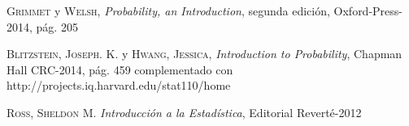 \documentclass[10pt,a4paper]{article}
\theoremstyle{definition}
\theoremstyle{remark}
\begin{document}
\begin{multicols}{2}
\begin{list}{}{\setlength{\topsep}{0mm}\setlength{\itemsep}{0mm}%
\setlength{\parsep}{0mm}\setlength{\leftmargin}{4mm}}
%
\small
\item[1.]  \textsc{Grimmet} y \textsc{Welsh},
	\textit{Probability, an Introduction}, segunda edición, Oxford-Press-2014, pág. 205
	
\item[2.] \textsc{Blitzstein, Joseph. K.} y \textsc{Hwang, Jessica},
	\textit{Introduction to Probability}, Chapman Hall CRC-2014, pág. 459 complementado con http://projects.iq.harvard.edu/stat110/home
	
\item[3.] \textsc{Ross, Sheldon M.}
	\textit{Introducción a la Estadística}, Editorial Reverté-2012

%
\end{list}
\end{multicols}
\end{document}

